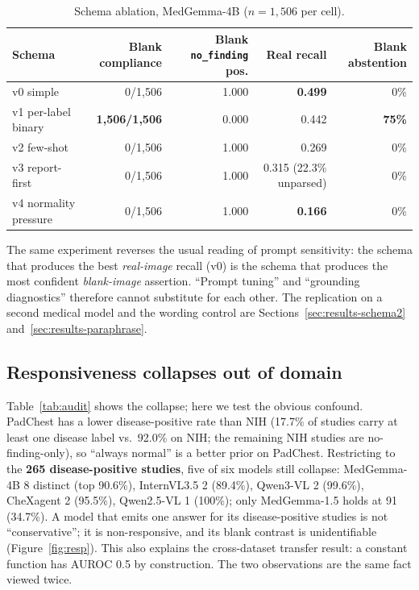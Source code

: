 \begin{table}[t]
\centering
\small
\caption{Schema ablation, MedGemma-4B ($n=1{,}506$ per cell).}
\label{tab:schema}
\begin{tabular}{lrrrr}
\toprule
Schema & Blank compliance & Blank \texttt{no\_finding} pos. & Real recall & Blank abstention \\
\midrule
v0 simple & 0/1,506 & 1.000 & \textbf{0.499} & 0\% \\
v1 per-label binary & \textbf{1,506/1,506} & 0.000 & 0.442 & \textbf{75\%} \\
v2 few-shot & 0/1,506 & 1.000 & 0.269 & 0\% \\
v3 report-first & 0/1,506 & 1.000 & 0.315 (22.3\% unparsed) & 0\% \\
v4 normality pressure & 0/1,506 & 1.000 & \textbf{0.166} & 0\% \\
\bottomrule
\end{tabular}
\end{table}

The same experiment reverses the usual reading of prompt sensitivity: the schema that produces the best \emph{real-image} recall (v0) is the schema that produces the most confident \emph{blank-image} assertion. ``Prompt tuning'' and ``grounding diagnostics'' therefore cannot substitute for each other. The replication on a second medical model and the wording control are Sections~\ref{sec:results-schema2} and~\ref{sec:results-paraphrase}.

\subsection{Responsiveness collapses out of domain}
\label{sec:results-collapse}

Table~\ref{tab:audit} shows the collapse; here we test the obvious confound. PadChest has a lower disease-positive rate than NIH (17.7\% of studies carry at least one disease label vs.\ 92.0\% on NIH; the remaining NIH studies are no-finding-only), so ``always normal'' is a better prior on PadChest. Restricting to the \textbf{265 disease-positive studies}, five of six models still collapse: MedGemma-4B 8 distinct (top 90.6\%), InternVL3.5 2 (89.4\%), Qwen3-VL 2 (99.6\%), CheXagent 2 (95.5\%), Qwen2.5-VL 1 (100\%); only MedGemma-1.5 holds at 91 (34.7\%). A model that emits one answer for its disease-positive studies is not ``conservative''; it is non-responsive, and its blank contrast is unidentifiable (Figure~\ref{fig:resp}). This also explains the cross-dataset transfer result: a constant function has AUROC 0.5 by construction. The two observations are the same fact viewed twice.

